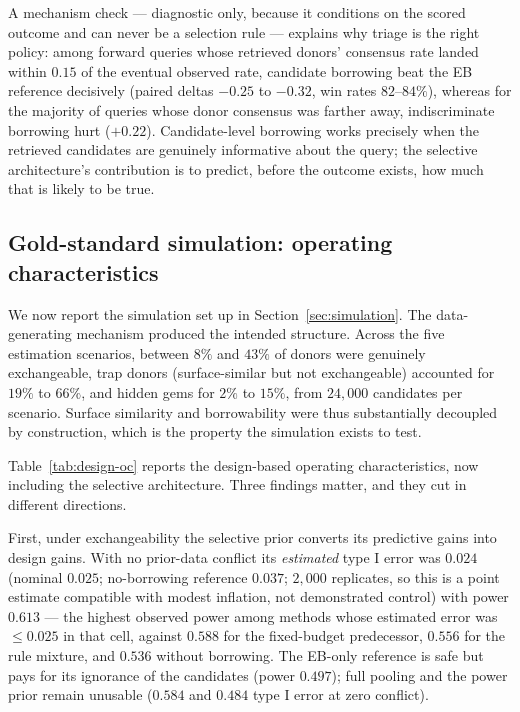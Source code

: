 \documentclass[11pt]{article}
\begin{document}
A mechanism check --- diagnostic only, because it conditions on the scored
outcome and can never be a selection rule --- explains why triage is the right
policy: among forward queries whose retrieved donors' consensus rate landed
within $0.15$ of the eventual observed rate, candidate borrowing beat the EB
reference decisively (paired deltas $-0.25$ to $-0.32$, win rates
$82$--$84\%$), whereas for the majority of queries whose donor consensus was
farther away, indiscriminate borrowing hurt ($+0.22$). Candidate-level
borrowing works precisely when the retrieved candidates are genuinely
informative about the query; the selective architecture's contribution is to
predict, before the outcome exists, how much that is likely to be true.

\subsection{Gold-standard simulation: operating characteristics}
\label{sec:goldsim-results}

We now report the simulation set up in Section~\ref{sec:simulation}. The
data-generating mechanism produced the intended structure. Across the five
estimation scenarios, between $8\%$ and $43\%$ of donors were genuinely
exchangeable, trap donors (surface-similar but not exchangeable) accounted for
$19\%$ to $66\%$, and hidden gems for $2\%$ to $15\%$, from $24{,}000$ candidates
per scenario. Surface similarity and borrowability were thus substantially
decoupled by construction, which is the property the simulation exists to test.

Table~\ref{tab:design-oc} reports the design-based operating characteristics,
now including the selective architecture. Three findings matter, and they cut
in different directions.

First, under exchangeability the selective prior converts its predictive
gains into design gains. With no prior-data conflict its \emph{estimated}
type I error was
$0.024$ (nominal $0.025$; no-borrowing reference $0.037$; $2{,}000$
replicates, so this is a point estimate compatible with modest inflation,
not demonstrated control) with power $0.613$
--- the highest observed power among methods whose estimated error was
$\le 0.025$ in that cell, against $0.588$
for the fixed-budget predecessor, $0.556$ for the rule mixture, and $0.536$
without borrowing. The EB-only reference is safe but pays for its ignorance of
the candidates (power $0.497$); full pooling and the power prior remain
unusable ($0.584$ and $0.484$ type I error at zero conflict).
\end{document}
